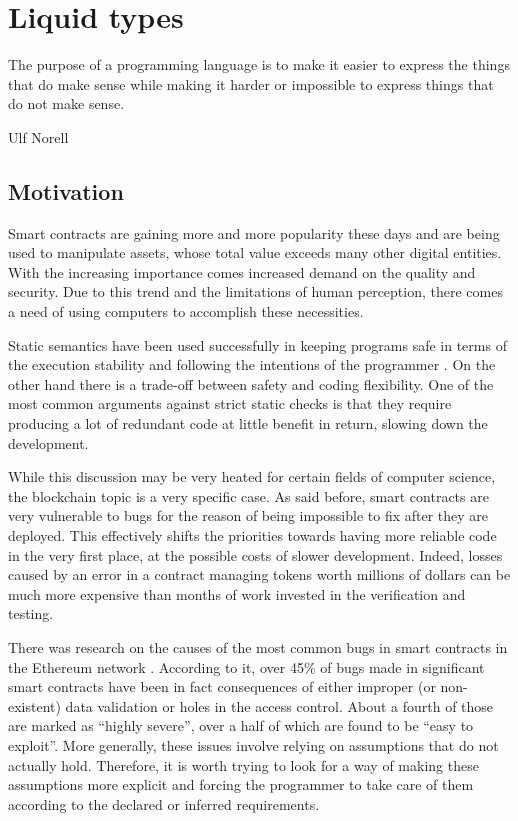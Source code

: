 \chapter{Liquid types}
\label{liquid_types}

\epigraph{The purpose of a programming language is to make it easier to
  express the things that do make sense while making it harder or impossible to
  express things that do not make sense.}{Ulf Norell}

\section{Motivation}

Smart contracts are gaining more and more popularity these days and are being
used to manipulate assets, whose total value exceeds many other digital
entities. With the increasing importance comes increased demand on the quality
and security. Due to this trend and the limitations of human perception, there
comes a need of using computers to accomplish these necessities.

Static semantics have been used successfully in keeping programs safe in terms
of the execution stability and following the intentions of the programmer
\cite{Lagouvardos:2020:PSM, Coblenz:2020:OTA,8445052,Feist_2019}. On the other
hand there is a trade-off between safety and coding flexibility. One of the most
common arguments against strict static checks is that they require producing a
lot of redundant code at little benefit in return, slowing down the development.

While this discussion may be very heated for certain fields of computer science,
the blockchain topic is a very specific case. As said before, smart contracts
are very vulnerable to bugs for the reason of being impossible to fix after
they are deployed. This effectively shifts the priorities towards having
more reliable code in the very first place, at the possible costs of slower
development. Indeed, losses caused by an error in a contract managing tokens
worth millions of dollars can be much more expensive than months of work
invested in the verification and testing.

There was research on the causes of the most common bugs in smart contracts in
the Ethereum network \cite{groce2020actual}. According to it, over 45\% of bugs
made in significant smart contracts have been in fact consequences of either
improper (or non-existent) data validation or holes in the access control. About
a fourth of those are marked as ``highly severe'', over a half of which are
found to be ``easy to exploit''. More generally, these issues involve relying on
assumptions that do not actually hold. Therefore, it is worth trying to look for
a way of making these assumptions more explicit and forcing the programmer to
take care of them according to the declared or inferred requirements.

